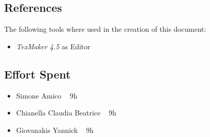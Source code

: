\documentclass[12pt]{article}
\begin{document}
		\subsection{References}
		The following tools where used in the creation of this document:
		\begin{itemize}
		\item \emph{TexMaker 4.5} as Editor
	
		\end{itemize}
		
		
		\subsection{Effort Spent}
		\begin{itemize}
		\item Simone Amico ~  9h
		\item Chianella Claudia Beatrice ~  9h
		\item Giovanakis Yannick ~  9h
		\end{itemize}

	 
	
\end{document}
